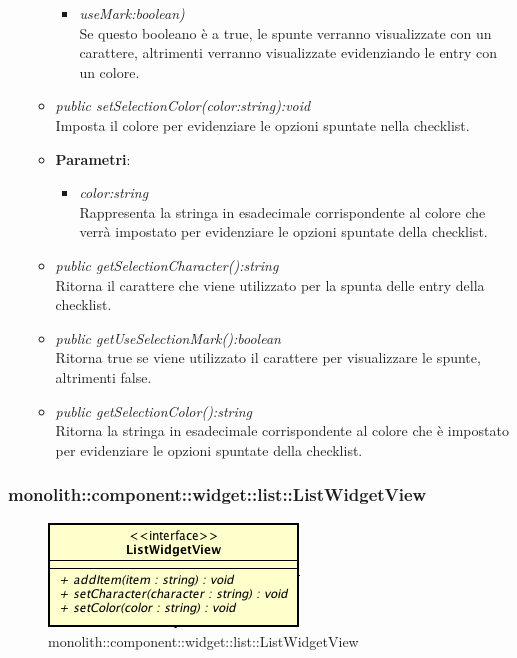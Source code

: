 \begin{itemize}
\begin{itemize}
{\begin{itemize}
		\item \textit{useMark:boolean)}\\
		Se questo booleano è a true, le spunte verranno visualizzate con un carattere, altrimenti verranno visualizzate evidenziando le entry con un colore.
		\end{itemize}}
	\item \textit{public setSelectionColor(color:string):void}\\
	Imposta il colore per evidenziare le opzioni spuntate nella checklist.
		\item{\textbf{Parametri}: \begin{itemize}
		\item \textit{color:string}\\
		Rappresenta la stringa in esadecimale corrispondente al colore che verrà impostato per evidenziare le opzioni spuntate della checklist.
		\end{itemize}}
	\item \textit{public getSelectionCharacter():string}\\
	Ritorna il carattere che viene utilizzato per la spunta delle entry della checklist.
	\item \textit{public getUseSelectionMark():boolean}\\
	Ritorna true se viene utilizzato il carattere per visualizzare le spunte, altrimenti false.
	\item \textit{public getSelectionColor():string}\\
	Ritorna la stringa in esadecimale corrispondente al colore che è impostato per evidenziare le opzioni spuntate della checklist.
	\end{itemize}
\end{itemize}

\subsubsection{monolith::component::widget::list::ListWidgetView}

\label{monolith::component::widget::list::ListWidgetView}
\begin{figure}[ht]
	\centering
	\includegraphics[scale=0.5]{Sezioni/SottosezioniST/img/ListWidgetView.png}
	\caption{monolith::component::widget::list::ListWidgetView}
\end{figure}

